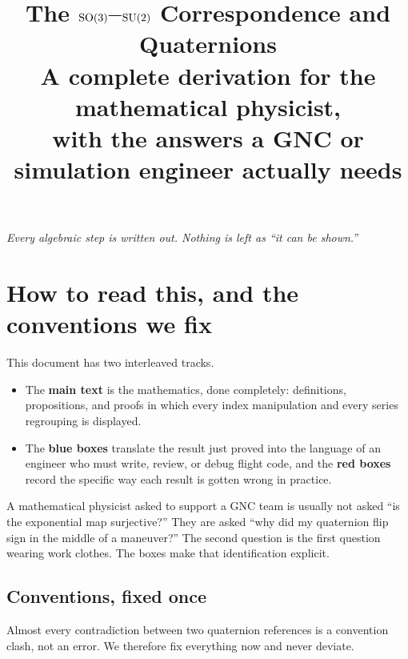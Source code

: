 \documentclass[11pt]{article}
\title{\bfseries The $\operatorname{SO}(3)$--$\operatorname{SU}(2)$ Correspondence and Quaternions\\[4pt]
\large A complete derivation for the mathematical physicist,\\
with the answers a GNC or simulation engineer actually needs}
\author{}
\date{}
\theoremstyle{plain}
\theoremstyle{definition}
\begin{document}
\maketitle
\vspace{-2.5em}

\begin{center}
\emph{Every algebraic step is written out. Nothing is left as ``it can be shown.''}
\end{center}

\tableofcontents
\newpage

\section{How to read this, and the conventions we fix}

This document has two interleaved tracks.

\begin{itemize}[leftmargin=1.4em]
\item The \textbf{main text} is the mathematics, done completely: definitions, propositions, and
proofs in which every index manipulation and every series regrouping is displayed.
\item The \textbf{blue boxes} translate the result just proved into the language of an engineer who
must write, review, or debug flight code, and the \textbf{red boxes} record the specific way each
result is gotten wrong in practice.
\end{itemize}

A mathematical physicist asked to support a GNC team is usually not asked ``is the exponential map
surjective?'' They are asked ``why did my quaternion flip sign in the middle of a maneuver?'' The
second question is the first question wearing work clothes. The boxes make that identification
explicit.

\subsection{Conventions, fixed once}

Almost every contradiction between two quaternion references is a convention clash, not an error.
We therefore fix everything now and never deviate.
\end{document}
